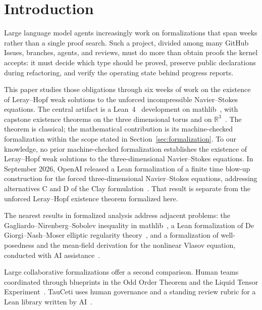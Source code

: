 \section{Introduction}\label{sec:introduction}

Large language model agents increasingly work on formalizations that span
weeks rather than a single proof search. Such a project, divided among
many GitHub Issues, branches, agents, and reviews, must do more than obtain proofs
the kernel accepts: it must decide which type should be proved, preserve
public declarations during refactoring, and verify the operating state
behind progress reports.

This paper studies those obligations through six weeks of work on the
existence of Leray--Hopf weak solutions to the unforced incompressible
Navier--Stokes equations. The central artifact is a
Lean~4~\cite{moura2021lean4} development on
mathlib~\cite{mathlib2020}, with capstone existence theorems on the
three dimensional torus and on $\mathbb{R}^3$~\cite{leray1934,hopf1951,
lerayhopf2026repo}. %
The theorem is classical; the mathematical contribution is its
machine-checked formalization within the scope stated in
Section~\ref{sec:formalization}.
To our knowledge, no prior machine-checked formalization establishes
the existence of Leray--Hopf weak solutions to the three-dimensional
Navier--Stokes equations. %
In September 2026, OpenAI released a Lean formalization of a finite time
blow-up construction for the forced three-dimensional Navier--Stokes
equations, addressing alternatives C and D of the Clay
formulation~\cite{openai2026navierstokes}. That
result is separate from the unforced Leray--Hopf existence theorem
formalized here.

The nearest results in formalized analysis address adjacent problems: the
Gagliardo--Nirenberg--Sobolev inequality in
mathlib~\cite{vandoorn2024gns}, a Lean formalization of
De Giorgi--Nash--Moser elliptic regularity
theory~\cite{armstrong2026degiorginashmoser}, and a formalization of
well-posedness and the mean-field derivation for the nonlinear Vlasov
equation, conducted with AI assistance~\cite{miller2026vlasov}.

Large collaborative formalizations offer a second comparison. Human teams
coordinated through blueprints in the Odd Order Theorem and the Liquid
Tensor Experiment~\cite{gonthier2013oddorder, commelin2023abstraction}.
TauCeti uses human governance and a standing review rubric for a Lean
library written by AI~\cite{tauceti2026}. %

